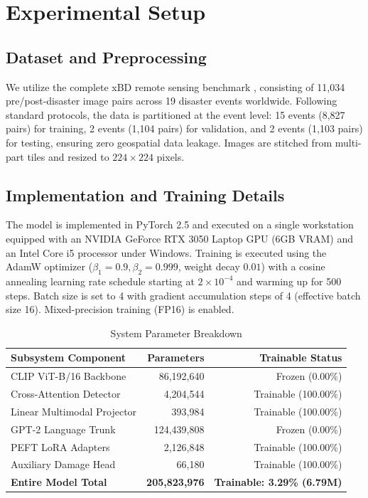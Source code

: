 \documentclass[conference]{IEEEtran}
\begin{document}
\section{Experimental Setup}

\subsection{Dataset and Preprocessing}
We utilize the complete xBD remote sensing benchmark \cite{gupta2019xbd}, consisting of 11,034 pre/post-disaster image pairs across 19 disaster events worldwide. Following standard protocols, the data is partitioned at the event level: 15 events (8,827 pairs) for training, 2 events (1,104 pairs) for validation, and 2 events (1,103 pairs) for testing, ensuring zero geospatial data leakage. Images are stitched from multi-part tiles and resized to $224 \times 224$ pixels.

\subsection{Implementation and Training Details}
The model is implemented in PyTorch 2.5 and executed on a single workstation equipped with an NVIDIA GeForce RTX 3050 Laptop GPU (6GB VRAM) and an Intel Core i5 processor under Windows. Training is executed using the AdamW optimizer ($\beta_1=0.9, \beta_2=0.999$, weight decay $0.01$) with a cosine annealing learning rate schedule starting at $2 \times 10^{-4}$ and warming up for 500 steps. Batch size is set to 4 with gradient accumulation steps of 4 (effective batch size 16). Mixed-precision training (FP16) is enabled.

\begin{table}[t]
\caption{System Parameter Breakdown}
\label{tab:params}
\centering
\begin{tabular}{lrr}
\toprule
\textbf{Subsystem Component} & \textbf{Parameters} & \textbf{Trainable Status} \\
\midrule
CLIP ViT-B/16 Backbone & 86,192,640 & Frozen (0.00\%) \\
Cross-Attention Detector & 4,204,544 & Trainable (100.00\%) \\
Linear Multimodal Projector & 393,984 & Trainable (100.00\%) \\
GPT-2 Language Trunk & 124,439,808 & Frozen (0.00\%) \\
PEFT LoRA Adapters & 2,126,848 & Trainable (100.00\%) \\
Auxiliary Damage Head & 66,180 & Trainable (100.00\%) \\
\midrule
\textbf{Entire Model Total} & \textbf{205,823,976} & \textbf{Trainable: 3.29\% (6.79M)} \\
\bottomrule
\end{tabular}
\end{table}
\end{document}
